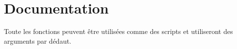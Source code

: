 
\chapter{Documentation}\label{ch:documentation}

Toute les fonctions peuvent être utilisées comme des scripts et utiliseront des arguments par dédaut.
\lstset{language=Matlab}

\newpage

